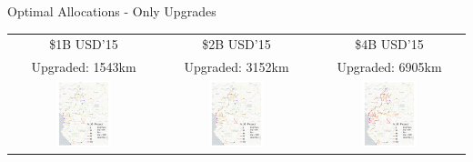 \documentclass[aspectratio=169,xcolor=dvipsnames]{beamer}
\begin{document}
\begin{frame}[label=IOU]{Optimal Allocations - Only Upgrades \quad \hyperlink{EXPOU}{}}
\vspace{-1mm}
\begin{adjustbox}{center}
\begin{tabular}{@{}c@{}|@{}c@{}|@{}c@{}} 
\$1B USD'15 & \$2B USD'15 & \$4B USD'15 \\
Upgraded: 1543km & Upgraded: 3152km & Upgraded: 6905km \\ 
\includegraphics[width=0.38\textwidth, trim= {0.9cm 0 0.9cm 0}, clip]{"../figures/GE/trans_africa_network_GE_20g_1b_fixed_cgc_sigma3.8_rho0_julia_MACR_90kmh_google_perc_ug.pdf"} & 
\includegraphics[width=0.38\textwidth, trim= {0.9cm 0 0.9cm 0}, clip]{"../figures/GE/trans_africa_network_GE_20g_2b_fixed_cgc_sigma3.8_rho0_julia_MACR_90kmh_google_perc_ug.pdf"} &
\includegraphics[width=0.38\textwidth, trim= {0.9cm 0 0.9cm 0}, clip]{"../figures/GE/trans_africa_network_GE_20g_4b_fixed_cgc_sigma3.8_rho0_julia_MACR_90kmh_google_perc_ug.pdf"}  
\end{tabular}
\end{adjustbox}
\end{frame}
\end{document}

